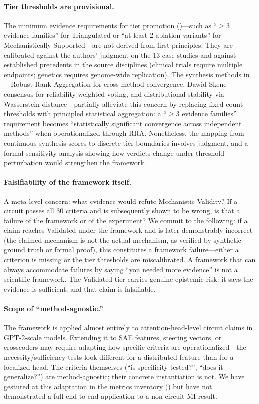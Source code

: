 \documentclass{article}
\begin{document}
\paragraph{Tier thresholds are provisional.} The minimum evidence requirements for tier promotion ()---such as ``$\geq 3$ evidence families'' for Triangulated or ``at least 2 ablation variants'' for Mechanistically Supported---are not derived from first principles. They are calibrated against the authors' judgment on the 13 case studies and against established precedents in the source disciplines (clinical trials require multiple endpoints; genetics requires genome-wide replication). The synthesis methods in ---Robust Rank Aggregation for cross-method convergence, Dawid-Skene consensus for reliability-weighted voting, and distributional stability via Wasserstein distance---partially alleviate this concern by replacing fixed count thresholds with principled statistical aggregation: a ``$\geq 3$ evidence families'' requirement becomes ``statistically significant convergence across independent methods'' when operationalized through RRA. Nonetheless, the mapping from continuous synthesis scores to discrete tier boundaries involves judgment, and a formal sensitivity analysis showing how verdicts change under threshold perturbation would strengthen the framework.

\paragraph{Falsifiability of the framework itself.} A meta-level concern: what evidence would refute Mechanistic Validity? If a circuit passes all 30 criteria and is subsequently shown to be wrong, is that a failure of the framework or of the experiment? We commit to the following: if a claim reaches Validated under the framework and is later demonstrably incorrect (the claimed mechanism is not the actual mechanism, as verified by synthetic ground truth or formal proof), this constitutes a framework failure---either a criterion is missing or the tier thresholds are miscalibrated. A framework that can always accommodate failures by saying ``you needed more evidence'' is not a scientific framework. The Validated tier carries genuine epistemic risk: it says the evidence is sufficient, and that claim is falsifiable.

\paragraph{Scope of ``method-agnostic.''}  The framework is applied almost entirely to attention-head-level circuit claims in GPT-2-scale models. Extending it to SAE features, steering vectors, or crosscoders may require adapting how specific criteria are operationalized---the necessity/sufficiency tests look different for a distributed feature than for a localized head. The criteria themselves (``is specificity tested?'', ``does it generalize?'') are method-agnostic; their concrete instantiation is not. We have gestured at this adaptation in the metrics inventory () but have not demonstrated a full end-to-end application to a non-circuit MI result.
\end{document}
